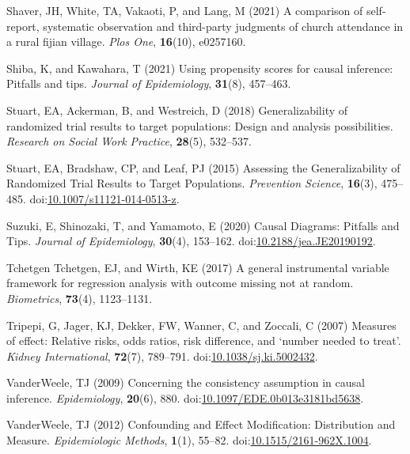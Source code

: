 \documentclass[
  single column]{article}
\newlength{\cslhangindent}
\newenvironment{CSLReferences}[2] %
 {\begin{list}{}{%
  \setlength{\itemindent}{0pt}
  \setlength{\leftmargin}{0pt}
  \setlength{\parsep}{0pt}
  \ifodd #1
   \setlength{\leftmargin}{\cslhangindent}
   \setlength{\itemindent}{-1\cslhangindent}
  \fi
  \setlength{\itemsep}{#2\baselineskip}}}
 {\end{list}}
\begin{document}
\begin{CSLReferences}{1}{0}
Shaver, JH, White, TA, Vakaoti, P, and Lang, M (2021) A comparison of
self-report, systematic observation and third-party judgments of church
attendance in a rural fijian village. \emph{Plos One}, \textbf{16}(10),
e0257160.

Shiba, K, and Kawahara, T (2021) Using propensity scores for causal
inference: Pitfalls and tips. \emph{Journal of Epidemiology},
\textbf{31}(8), 457--463.

Stuart, EA, Ackerman, B, and Westreich, D (2018) Generalizability of
randomized trial results to target populations: Design and analysis
possibilities. \emph{Research on Social Work Practice}, \textbf{28}(5),
532--537.

Stuart, EA, Bradshaw, CP, and Leaf, PJ (2015) Assessing the
Generalizability of Randomized Trial Results to Target Populations.
\emph{Prevention Science}, \textbf{16}(3), 475--485.
doi:\href{https://doi.org/10.1007/s11121-014-0513-z}{10.1007/s11121-014-0513-z}.

Suzuki, E, Shinozaki, T, and Yamamoto, E (2020) Causal Diagrams:
Pitfalls and Tips. \emph{Journal of Epidemiology}, \textbf{30}(4),
153--162.
doi:\href{https://doi.org/10.2188/jea.JE20190192}{10.2188/jea.JE20190192}.

Tchetgen Tchetgen, EJ, and Wirth, KE (2017) A general instrumental
variable framework for regression analysis with outcome missing not at
random. \emph{Biometrics}, \textbf{73}(4), 1123--1131.

Tripepi, G, Jager, KJ, Dekker, FW, Wanner, C, and Zoccali, C (2007)
Measures of effect: Relative risks, odds ratios, risk difference, and
{`}number needed to treat{'}. \emph{Kidney International},
\textbf{72}(7), 789--791.
doi:\href{https://doi.org/10.1038/sj.ki.5002432}{10.1038/sj.ki.5002432}.

VanderWeele, TJ (2009) Concerning the consistency assumption in causal
inference. \emph{Epidemiology}, \textbf{20}(6), 880.
doi:\href{https://doi.org/10.1097/EDE.0b013e3181bd5638}{10.1097/EDE.0b013e3181bd5638}.

VanderWeele, TJ (2012) Confounding and Effect Modification: Distribution
and Measure. \emph{Epidemiologic Methods}, \textbf{1}(1), 55--82.
doi:\href{https://doi.org/10.1515/2161-962X.1004}{10.1515/2161-962X.1004}.


\end{CSLReferences}
\end{document}
